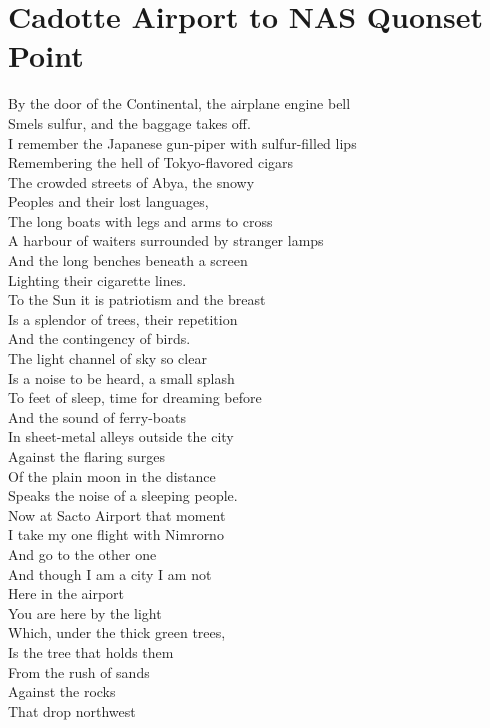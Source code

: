 \documentclass[smalldemyvopaper,11pt,twoside,onecolumn,openright,extrafontsizes]{memoir}
\newlength\drop
\begin{document}
\chapter{Cadotte Airport to NAS Quonset Point}
By the door of the Continental, the airplane engine bell
\\Smels sulfur, and the baggage takes off.
\\I remember the Japanese gun-piper with sulfur-filled lips
\\Remembering the hell of Tokyo-flavored cigars
\\The crowded streets of Abya, the snowy
\\Peoples and their lost languages,
\\The long boats with legs and arms to cross
\\A harbour of waiters surrounded by stranger lamps
\\And the long benches beneath a screen
\\Lighting their cigarette lines.
\\To the Sun it is patriotism and the breast
\\Is a splendor of trees, their repetition
\\And the contingency of birds.
\\The light channel of sky so clear
\\Is a noise to be heard, a small splash
\\To feet of sleep, time for dreaming before
\\And the sound of ferry-boats
\\In sheet-metal alleys outside the city
\\Against the flaring surges
\\Of the plain moon in the distance
\\Speaks the noise of a sleeping people.
\\Now at Sacto Airport that moment
\\I take my one flight with Nimrorno
\\And go to the other one
\\And though I am a city I am not
\\Here in the airport
\\You are here by the light
\\Which, under the thick green trees,
\\Is the tree that holds them
\\From the rush of sands
\\Against the rocks
\\That drop northwest
\end{document}

